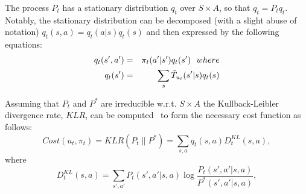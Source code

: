 \documentclass[letterpaper]{aamas2009}
\begin{document}
The process $P_t$ has a stationary distribution $q_t$ over $S\times
A$, so that $q_t=P_tq_t$. Notably, the stationary distribution can be
decomposed (with a slight abuse of notation) $q_t(s,a)=q_t(a|s)q_t(s)$
and then expressed by the following equations:
\begin{eqnarray*}
q_t(s',a')&=&\pi_t(a'|s')q_t(s')\ \ \displaystyle{where}\\
q_t(s')&=&\sum\limits_s\Tilde{T}_{u_t}(s'|s)q_t(s)
\end{eqnarray*}

Assuming that $P_t$ and $P^*$ are irreducible w.r.t. $S\times A$ the
Kullback-Leibler divergence rate, $KLR$, can be computed~\cite{rached_alajaji_campbell_2004} to form the
necessary cost function as follows:
$$
Cost(u_t,\pi_t)=KLR(P_t\|P^*)=\sum\limits_{s,a}q_t(s,a)D^{KL}_t(s,a),$$
where $$D^{KL}_t(s,a)=\sum\limits_{s',a'}P_t(s',a'|s,a)\log\frac{P_t(s',a'|s,a)}{P^*(s',a'|s,a)},
$$
\end{document}
